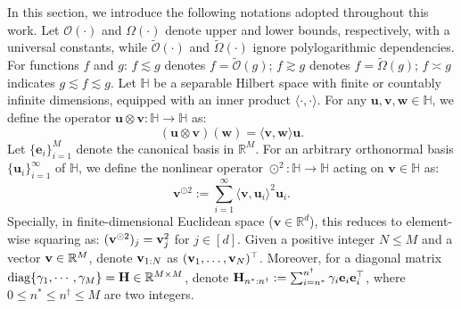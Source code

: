In this section, we introduce the following notations adopted throughout this work. Let $\mathcal{O}(\cdot)$ and $\Omega(\cdot)$ denote upper and lower bounds, respectively, with a universal constants, while $\widetilde{\mathcal{O}}(\cdot)$ and $\widetilde{\Omega}(\cdot)$ ignore polylogarithmic dependencies. For functions $f$ and $g$: $f \lesssim g$ denotes $f = \widetilde{\mathcal{O}}(g)$; $f \gtrsim g$ denotes $f = \widetilde{\Omega}(g)$; $f \asymp g$ indicates $g \lesssim f \lesssim g$. Let $\mathbb{H}$ be a separable Hilbert space with finite or countably infinite dimensions, equipped with an inner product $\langle \cdot, \cdot \rangle$. For any $\mathbf{u}, \mathbf{v}, \mathbf{w} \in \mathbb{H}$, we define the operator $\mathbf{u} \otimes \mathbf{v}: \mathbb{H} \to \mathbb{H}$ as:
\begin{equation}
    (\mathbf{u} \otimes \mathbf{v})(\mathbf{w}) = \langle \mathbf{v}, \mathbf{w} \rangle \mathbf{u}.
\end{equation}
Let $\{\mathbf{e}_i\}_{i=1}^M$ denote the canonical basis in $\mathbb{R}^M$. For an arbitrary orthonormal basis $\{\mathbf{u}_i\}_{i=1}^\infty$ of $\mathbb{H}$, we define the nonlinear operator $\odot^2: \mathbb{H} \to \mathbb{H}$ acting on $\mathbf{v} \in \mathbb{H}$ as:
\begin{equation}
    \mathbf{v}^{\odot 2} := \sum_{i=1}^\infty \langle \mathbf{v}, \mathbf{u}_i \rangle^2 \mathbf{u}_i.
\end{equation}
Specially, in finite-dimensional Euclidean space ($\mathbf{v} \in \mathbb{R}^d$), this reduces to element-wise squaring as: $(\mathbf{v}^{\odot 2})_j = \mathbf{v}_j^2$ for $j \in [d]$. Given a positive integer $N \leq M$ and a vector $\mathbf{v} \in \mathbb{R}^M$, denote $\mathbf{v}_{1:N}$ as $(\mathbf{v}_1, \ldots, \mathbf{v}_N)^{\top}$. Moreover, for a diagonal matrix $\operatorname*{diag}\{\gamma_1,\cdots,\gamma_M\}=\mathbf{H}\in\mathbb{R}^{M\times M}$, denote $\mathbf{H}_{n^*:n^{\dagger}}:=\sum_{i=n^*}^{n^{\dagger}}\gamma_i\mathbf{e}_i\mathbf{e}_i^{\top}$, where $0\leq n^*\leq n^{\dagger}\leq M$ are two integers. 

